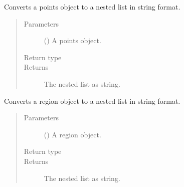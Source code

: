 \documentclass[letterpaper,10pt,english]{sphinxmanual}
\begin{document}

\begin{fulllineitems}
\label{\detokenize{index:secondodb.api.algebras.secondospatialalgebra.convert_points_to_list_exp_str}}
Converts a points object to a nested list in string format.
\begin{quote}\begin{description}
\item[{Parameters}] \leavevmode
{} (\sphinxstyleliteralemphasis{\sphinxupquote{{[}}}\sphinxstyleliteralemphasis{\sphinxupquote{{]}}}) \textendash{} A points object.

\item[{Return type}] \leavevmode
{}

\item[{Returns}] \leavevmode
The nested list as string.

\end{description}\end{quote}

\end{fulllineitems}


\begin{fulllineitems}
\label{\detokenize{index:secondodb.api.algebras.secondospatialalgebra.convert_region_to_list_exp_str}}
Converts a region object to a nested list in string format.
\begin{quote}\begin{description}
\item[{Parameters}] \leavevmode
{} ({\hyperref[\detokenize{index:secondodb.api.algebras.secondospatialalgebra.Region}]{}}) \textendash{} A region object.

\item[{Return type}] \leavevmode
{}

\item[{Returns}] \leavevmode
The nested list as string.

\end{description}\end{quote}

\end{fulllineitems}
\end{document}

